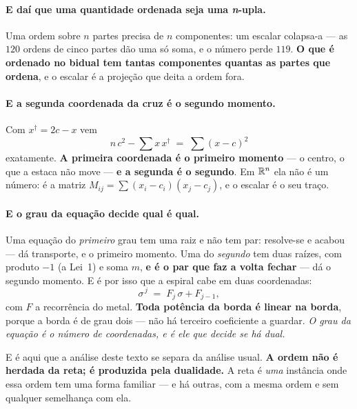 \documentclass[livro.tex]{subfiles}
\begin{document}
\paragraph{E daí que uma quantidade ordenada seja uma \emph{n}-upla.} Uma ordem sobre $n$ partes
precisa de $n$ componentes: um escalar colapsa-a --- as $120$ ordens de cinco partes dão uma só soma,
e o número perde $119$. \textbf{O que é ordenado no bidual tem tantas componentes quantas as partes
que ordena}, e o escalar é a projeção que deita a ordem fora.

\paragraph{E a segunda coordenada da cruz é o segundo momento.} Com $x^{\dagger}=2c-x$ vem
\[
  n\,c^{2} - \sum x\,x^{\dagger} \;=\; \sum (x-c)^{2}
\]
exatamente. \textbf{A primeira coordenada é o primeiro momento} --- o centro, o que a estaca não
move --- \textbf{e a segunda é o segundo}. Em $\mathbb R^{n}$ ela não é um número: é a matriz
$M_{ij}=\sum(x_i-c_i)(x_j-c_j)$, e o escalar é o seu traço.

\paragraph{E o grau da equação decide qual é qual.} Uma equação do \emph{primeiro} grau tem uma raiz
e não tem par: resolve-se e acabou --- dá transporte, e o primeiro momento. Uma do \emph{segundo} tem
duas raízes, com produto $-1$ (a Lei~1) e soma $m$, \textbf{e é o par que faz a volta fechar} --- dá
o segundo momento. E é por isso que a espiral cabe em duas coordenadas:
\[
  \sigma^{\,j} \;=\; F_j\,\sigma + F_{j-1},
\]
com $F$ a recorrência do metal. \textbf{Toda potência da borda é linear na borda}, porque a borda é
de grau dois --- não há terceiro coeficiente a guardar. \emph{O grau da equação é o número de
coordenadas, e é ele que decide se há dual.}


\noindent E é aqui que a análise deste texto se separa da análise usual. \textbf{A ordem não é
herdada da reta; é produzida pela dualidade.} A reta é \emph{uma} instância onde essa ordem tem uma
forma familiar --- e há outras, com a mesma ordem e sem qualquer semelhança com ela.
\end{document}
